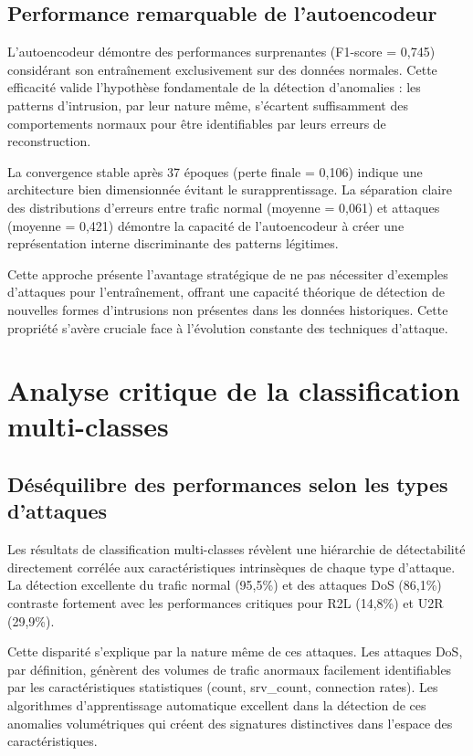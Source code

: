 \subsection{Performance remarquable de l'autoencodeur}

L'autoencodeur démontre des performances surprenantes (F1-score = 0,745) considérant son entraînement exclusivement sur des données normales. Cette efficacité valide l'hypothèse fondamentale de la détection d'anomalies : les patterns d'intrusion, par leur nature même, s'écartent suffisamment des comportements normaux pour être identifiables par leurs erreurs de reconstruction.

La convergence stable après 37 époques (perte finale = 0,106) indique une architecture bien dimensionnée évitant le surapprentissage. La séparation claire des distributions d'erreurs entre trafic normal (moyenne = 0,061) et attaques (moyenne = 0,421) démontre la capacité de l'autoencodeur à créer une représentation interne discriminante des patterns légitimes.

Cette approche présente l'avantage stratégique de ne pas nécessiter d'exemples d'attaques pour l'entraînement, offrant une capacité théorique de détection de nouvelles formes d'intrusions non présentes dans les données historiques. Cette propriété s'avère cruciale face à l'évolution constante des techniques d'attaque.

\section{Analyse critique de la classification multi-classes}

\subsection{Déséquilibre des performances selon les types d'attaques}

Les résultats de classification multi-classes révèlent une hiérarchie de détectabilité directement corrélée aux caractéristiques intrinsèques de chaque type d'attaque. La détection excellente du trafic normal (95,5\%) et des attaques DoS (86,1\%) contraste fortement avec les performances critiques pour R2L (14,8\%) et U2R (29,9\%).

Cette disparité s'explique par la nature même de ces attaques. Les attaques DoS, par définition, génèrent des volumes de trafic anormaux facilement identifiables par les caractéristiques statistiques (count, srv\_count, connection rates). Les algorithmes d'apprentissage automatique excellent dans la détection de ces anomalies volumétriques qui créent des signatures distinctives dans l'espace des caractéristiques.

